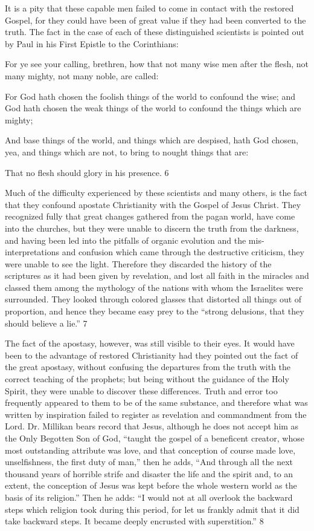 It is a pity that these capable men failed to come in contact with the restored Gospel, for they
could have been of great value if they had been converted to the truth. The fact in the case of
each of these distinguished scientists is pointed out by Paul in his First Epistle to the
Corinthians:

For ye see your calling, brethren, how that not many wise men after the flesh, not many
mighty, not many noble, are called:

For God hath chosen the foolish things of the world to confound the wise; and God hath
chosen the weak things of the world to confound the things which are mighty;

And base things of the world, and things which are despised, hath God chosen, yea, and
things which are not, to bring to nought things that are:

That no flesh should glory in his presence. 6

Much of the difficulty experienced by these scientists and many others, is the fact that they
confound apostate Christianity with the Gospel of Jesus Christ. They recognized fully that
great changes gathered from the pagan world, have come into the churches, but they were
unable to discern the truth from the darkness, and having been led into the pitfalls of organic
evolution and the mis-interpretations and confusion which came through the destructive
criticism, they were unable to see the light. Therefore they discarded the history of the
scriptures as it had been given by revelation, and lost all faith in the miracles and classed
them among the mythology of the nations with whom the Israelites were surrounded. They
looked through colored glasses that distorted all things out of proportion, and hence they
became easy prey to the ``strong delusions, that they should believe a lie.'' 7

The fact of the apostasy, however, was still visible to their eyes. It would have been to the
advantage of restored Christianity had they pointed out the fact of the great apostasy, without
confusing the departures from the truth with the correct teaching of the prophets; but being
without the guidance of the Holy Spirit, they were unable to discover these differences. Truth
and error too frequently appeared to them to be of the same substance, and therefore what
was written by inspiration failed to register as revelation and commandment from the Lord.
Dr. Millikan bears record that Jesus, although he does not accept him as the Only Begotten
Son of God, ``taught the gospel of a beneficent creator, whose most outstanding attribute was
love, and that conception of course made love, unselfishness, the first duty of man,'' then he
adds, ``And through all the next thousand years of horrible strife and disaster the life and the
spirit and, to an extent, the conception of Jesus was kept before the whole western world as
the basis of its religion.'' Then he adds: ``I would not at all overlook the backward steps which
religion took during this period, for let us frankly admit that it did take backward steps. It
became deeply encrusted with superstition.'' 8

